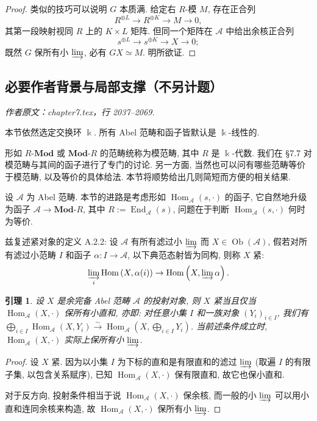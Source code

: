 \documentclass[11pt]{article}
\newcommand{\Obj}{\operatorname{Ob}}
\newcommand{\Hom}{\operatorname{Hom}}
\newcommand{\End}{\operatorname{End}}
\newcommand{\cated}[1]{\mathbf{#1}\text{-}}
\newcommand{\dcate}[1]{\text{-}\mathbf{#1}}
\newcommand{\rightiso}{\xrightarrow{\sim}}
\renewcommand{\index}[2][]{\relax}
\newcommand{\CorpusNumber}{0}
\newtheorem{lemma}[theorem]{引理}
\theoremstyle{definition}
\begin{document}
\begin{proof}
	类似的技巧可以说明 $G$ 本质满. 给定右 $R$-模 $M$, 存在正合列
	\[ R^{\oplus L} \to R^{\oplus K} \to M \to 0, \]
	其第一段映射视同 $R$ 上的 $K \times L$ 矩阵. 但同一个矩阵在 $\mathcal{A}$ 中给出余核正合列
	\[ s^{\oplus L} \to s^{\oplus K} \to X \to 0; \]
	既然 $G$ 保所有小 $\varinjlim$, 必有 $GX \simeq M$. 明所欲证.
\end{proof}
\subsection*{必要作者背景与局部支撑（不另计题）}
\par\medskip\noindent\textit{作者原文：chapter7.tex，行 2037--2069.}\par
本节依然选定交换环 $\Bbbk$. 所有 Abel 范畴和函子皆默认是 $\Bbbk$-线性的.

形如 $R\dcate{Mod}$ 或 $\cated{Mod}R$ 的范畴统称为模范畴, 其中 $R$ 是 $\Bbbk$-代数. 我们在 \S7.7 对模范畴与其间的函子进行了专门的讨论. 另一方面, 当然也可以问有哪些范畴等价于模范畴, 以及等价的具体给法. 本节将顺势给出几则简短而方便的相关结果.

设 $\mathcal{A}$ 为 Abel 范畴. 本节的进路是考虑形如 $\Hom_{\mathcal{A}}(s, \cdot)$ 的函子, 它自然地升级为函子 $\mathcal{A} \to \cated{Mod}R$, 其中 $R := \End_{\mathcal{A}}(s)$, 问题在于判断 $\Hom_{\mathcal{A}}(s, \cdot)$ 何时为等价.

\index{jinduixiang}
兹复述紧对象的定义 A.2.2: 设 $\mathcal{A}$ 有所有滤过小 $\varinjlim$ 而 $X \in \Obj(\mathcal{A})$, 假若对所有滤过小范畴 $I$ 和函子 $\alpha: I \to \mathcal{A}$, 以下典范态射皆为同构, 则称 $X$ 紧:
\[ \varinjlim_i \Hom\left( X, \alpha(i) \right) \to \Hom\left( X, \varinjlim \alpha \right). \]

\def\CorpusNumber{7.8.1}
\begin{lemma}\label{prop:proj-compact}
	设 $X$ 是余完备 Abel 范畴 $\mathcal{A}$ 的投射对象, 则 $X$ 紧当且仅当 $\Hom_{\mathcal{A}}(X, \cdot)$ 保所有小直和, 亦即: 对任意小集 $I$ 和一族对象 $(Y_i)_{i \in I}$, 我们有 $\bigoplus_{i \in I} \Hom_{\mathcal{A}}(X, Y_i) \rightiso \Hom_{\mathcal{A}}(X, \bigoplus_{i \in I} Y_i)$. 当前述条件成立时, $\Hom_{\mathcal{A}}(X, \cdot)$ 实际上保所有小 $\varinjlim$.
\end{lemma}
\begin{proof}
	设 $X$ 紧. 因为以小集 $I$ 为下标的直和是有限直和的滤过 $\varinjlim$ (取遍 $I$ 的有限子集, 以包含关系赋序), 已知 $\Hom_{\mathcal{A}}(X, \cdot)$ 保有限直和, 故它也保小直和.
	
	对于反方向, 投射条件相当于说 $\Hom_{\mathcal{A}}(X, \cdot)$ 保余核, 而一般的小 $\varinjlim$ 可以用小直和连同余核来构造, 故 $\Hom_{\mathcal{A}}(X, \cdot)$ 保所有小 $\varinjlim$.
\end{proof}
\end{document}
